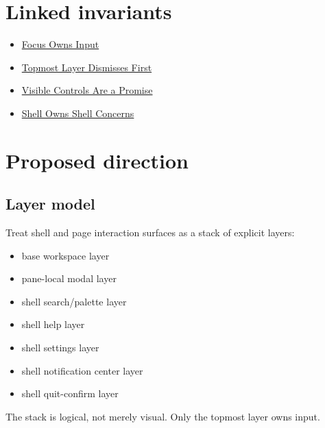 \section{Linked invariants}\label{record-254-linked-invariants}

\begin{itemize}
\tightlist
\item
  \href{https://github.com/flyingrobots/bijou/blob/cbd70612140e7a450d764b3c7be1c6af878b99bc/docs/invariants/focus-owns-input.md}{Focus Owns Input}
\item
  \href{https://github.com/flyingrobots/bijou/blob/cbd70612140e7a450d764b3c7be1c6af878b99bc/docs/invariants/topmost-layer-dismisses-first.md}{Topmost Layer Dismisses First}
\item
  \href{https://github.com/flyingrobots/bijou/blob/cbd70612140e7a450d764b3c7be1c6af878b99bc/docs/invariants/visible-controls-are-a-promise.md}{Visible Controls Are a Promise}
\item
  \href{https://github.com/flyingrobots/bijou/blob/cbd70612140e7a450d764b3c7be1c6af878b99bc/docs/invariants/shell-owns-shell-concerns.md}{Shell Owns Shell Concerns}
\end{itemize}

\section{Proposed direction}\label{record-254-proposed-direction}

\subsection{Layer model}\label{record-254-layer-model}

Treat shell and page interaction surfaces as a stack of explicit layers:

\begin{itemize}
\tightlist
\item
  base workspace layer
\item
  pane-local modal layer
\item
  shell search/palette layer
\item
  shell help layer
\item
  shell settings layer
\item
  shell notification center layer
\item
  shell quit-confirm layer
\end{itemize}

The stack is logical, not merely visual. Only the topmost layer owns input.

